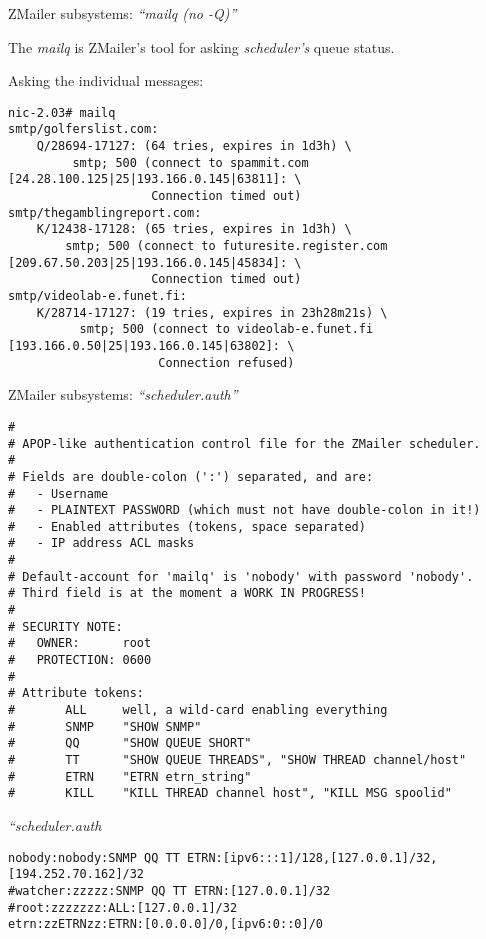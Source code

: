 \documentclass[a4paper,landscape]{slides}
\newcommand{\ZM}{ZMailer}
\begin{document}
\begin{slide}
\centerline{\large \ZM{} subsystems: {\em ``mailq (no -Q)''}}

The {\em mailq} is \ZM's tool for asking {\em scheduler's} queue status.

Asking the individual messages:

{\tiny
\begin{verbatim}
nic-2.03# mailq
smtp/golferslist.com:
    Q/28694-17127: (64 tries, expires in 1d3h) \
         smtp; 500 (connect to spammit.com [24.28.100.125|25|193.166.0.145|63811]: \
                    Connection timed out)
smtp/thegamblingreport.com:
    K/12438-17128: (65 tries, expires in 1d3h) \
        smtp; 500 (connect to futuresite.register.com [209.67.50.203|25|193.166.0.145|45834]: \
                    Connection timed out)
smtp/videolab-e.funet.fi:
    K/28714-17127: (19 tries, expires in 23h28m21s) \
          smtp; 500 (connect to videolab-e.funet.fi [193.166.0.50|25|193.166.0.145|63802]: \
                     Connection refused)
\end{verbatim}
}

\vfill
\end{slide}


\begin{overlay}

\centerline{\large \ZM{} subsystems: {\em ``scheduler.auth''}}
\tiny
\begin{verbatim}
#
# APOP-like authentication control file for the ZMailer scheduler.
#
# Fields are double-colon (':') separated, and are:
#   - Username
#   - PLAINTEXT PASSWORD (which must not have double-colon in it!)
#   - Enabled attributes (tokens, space separated)
#   - IP address ACL masks
#
# Default-account for 'mailq' is 'nobody' with password 'nobody'.
# Third field is at the moment a WORK IN PROGRESS!
#
# SECURITY NOTE:
#   OWNER:      root
#   PROTECTION: 0600
#
# Attribute tokens:
#       ALL     well, a wild-card enabling everything
#       SNMP    "SHOW SNMP"
#       QQ      "SHOW QUEUE SHORT"
#       TT      "SHOW QUEUE THREADS", "SHOW THREAD channel/host"
#       ETRN    "ETRN etrn_string"
#       KILL    "KILL THREAD channel host", "KILL MSG spoolid"
\end{verbatim}
\vfill
\end{overlay}
\begin{overlay}
\centerline{{\em ``scheduler.auth}}
\tiny
\begin{verbatim}
nobody:nobody:SNMP QQ TT ETRN:[ipv6:::1]/128,[127.0.0.1]/32,[194.252.70.162]/32
#watcher:zzzzz:SNMP QQ TT ETRN:[127.0.0.1]/32
#root:zzzzzzz:ALL:[127.0.0.1]/32
etrn:zzETRNzz:ETRN:[0.0.0.0]/0,[ipv6:0::0]/0
\end{verbatim}
\vfill
\end{overlay}
\end{document}
